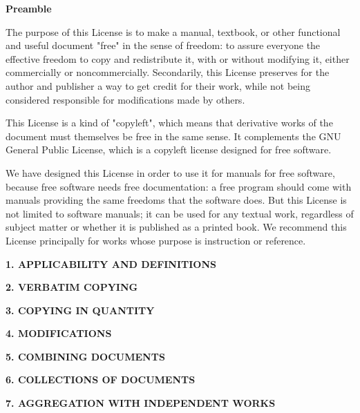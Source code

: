 \documentclass[a4paper,11pt]{article}
\begin{document}
\begin{center}
  {\bf\large Preamble}
\end{center}

The purpose of this License is to make a manual, textbook, or other functional and useful document "free" in the sense of freedom: to assure everyone the effective freedom to copy and redistribute it, with or without modifying it, either commercially or noncommercially. Secondarily, this License preserves for the author and publisher a way to get credit for their work, while not being considered responsible for modifications made by others.

This License is a kind of "copyleft", which means that derivative works of the document must themselves be free in the same sense. It complements the GNU General Public License, which is a copyleft license designed for free software.

We have designed this License in order to use it for manuals for free software, because free software needs free documentation: a free program should come with manuals providing the same freedoms that the software does. But this License is not limited to software manuals; it can be used for any textual work, regardless of subject matter or whether it is published as a printed book. We recommend this License principally for works whose purpose is instruction or reference.

\begin{center}
  {\Large\bf 1. APPLICABILITY AND DEFINITIONS}
\end{center}

\begin{center}
  {\Large\bf 2. VERBATIM COPYING}
\end{center}

\begin{center}
  {\Large\bf 3. COPYING IN QUANTITY}
\end{center}


\begin{center}
  {\Large\bf 4. MODIFICATIONS}
\end{center}


\begin{center}
  {\Large\bf 5. COMBINING DOCUMENTS}
\end{center}


\begin{center}
  {\Large\bf 6. COLLECTIONS OF DOCUMENTS}
\end{center}


\begin{center}
  {\Large\bf 7. AGGREGATION WITH INDEPENDENT WORKS}
\end{center}
\end{document}
